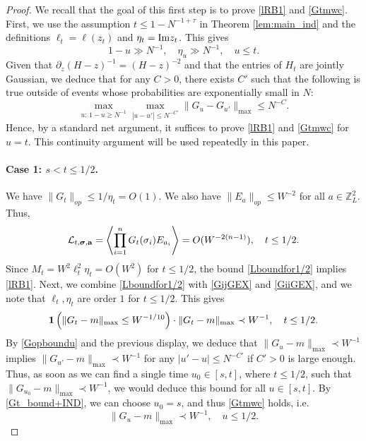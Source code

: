 \begin{proof}
We recall that the goal of this first step is to prove \eqref{lRB1} and \eqref{Gtmwc}. First, we use the assumption $t\leq1-N^{-1+\tau}$ in Theorem \ref{lem:main_ind} and the definitions \(\ell_t = \ell(z_t)\) and \(\eta_t = \mathrm{Im} z_t\). This gives
$$
1 - u \gg N^{-1}, \quad \eta_u \gg N^{-1}, \quad u \le t.
$$
Given that \(\partial_z (H - z)^{-1} = (H - z)^{-2}\) and that the entries of \(H_t\) are jointly Gaussian, we deduce that for any \(C > 0\), there exists \(C'\) such that the following is true outside of events whose probabilities are exponentially small in $N$:
\begin{equation}\label{Gopboundu}
    \max_{u:\,1-u \ge N^{-1}} \max_{|u - u'| \leq N^{-C'}} \| G_u - G_{u'} \|_{\max} \leq N^{-C}.
\end{equation}
Hence, by a standard net argument, it suffices to prove \eqref{lRB1} and \eqref{Gtmwc} for \(u = t\). This continuity argument will be used repeatedly in this paper. 

\paragraph{Case 1: \(s < t \leq 1/2\).} 
We have $\|G_{t}\|_{op}\leq1/\eta_{t}=O(1)$. We also have \(\|E_a\|_{op} \leq W^{-2}\) for all \(a \in \mathbb{Z}_L^{2}\). Thus,  
\begin{equation}\label{Lboundfor1/2}
    {\cal L}_{t, \boldsymbol{\sigma}, \textbf{a}} = \left\langle \prod_{i=1}^n G_t(\sigma_i) E_{a_i} \right\rangle = O(W^{-2(n-1)}), \quad t \leq 1/2.
\end{equation}
Since $M_{t}=W^{2}\ell_{t}^{2}\eta_{t}=O(W^{2})$ for $t\leq1/2$, the bound \eqref{Lboundfor1/2} implies \eqref{lRB1}. Next, we combine \eqref{Lboundfor1/2} with \eqref{GijGEX} and \eqref{GiiGEX}, and we note that $\ell_{t},\eta_{t}$ are order $1$ for $t\leq1/2$. This gives
$$
{\bf 1}\left(\|G_t - m\|_{\max} \leq W^{-1/10}\right) \cdot \|G_t - m\|_{\max} \prec W^{-1}, \quad t \leq 1/2.
$$
By \eqref{Gopboundu} and the previous display, we deduce that $\|G_{u}-m\|_{\max}\prec W^{-1}$ implies $\|G_{u'}-m\|_{\max}\prec W^{-1}$ for any $|u'-u|\leq N^{-C'}$ if $C'>0$ is large enough. Thus, as soon as we can find a single time $u_{0}\in[s,t]$, where $t\leq1/2$, such that $\|G_{u_{0}}-m\|_{\max}\prec W^{-1}$, we would deduce this bound for all $u\in[s,t]$. By \eqref{Gt_bound+IND}, we can choose $u_{0}=s$, and thus \eqref{Gtmwc} holds, i.e.
\begin{equation}\label{Gtmt12}
    \|G_u - m\|_{\max} \prec W^{-1}, \quad u \leq 1/2.
\end{equation}


\end{proof}
